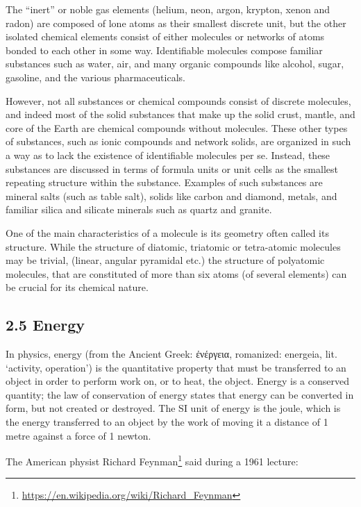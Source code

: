 \documentclass[
]{article}
\let\rmarkdownfootnote\footnote%
\def\footnote{\protect\rmarkdownfootnote}
\renewcommand{\href}[2]{#2\footnote{\url{#1}}}
\theoremstyle{definition}
\theoremstyle{definition}
\theoremstyle{definition}
\theoremstyle{remark}
\begin{document}
The ``inert'' or noble gas elements (helium, neon, argon, krypton, xenon
and radon) are composed of lone atoms as their smallest discrete unit,
but the other isolated chemical elements consist of either molecules or
networks of atoms bonded to each other in some way. Identifiable
molecules compose familiar substances such as water, air, and many
organic compounds like alcohol, sugar, gasoline, and the various
pharmaceuticals.

However, not all substances or chemical compounds consist of discrete
molecules, and indeed most of the solid substances that make up the
solid crust, mantle, and core of the Earth are chemical compounds
without molecules. These other types of substances, such as ionic
compounds and network solids, are organized in such a way as to lack the
existence of identifiable molecules per se. Instead, these substances
are discussed in terms of formula units or unit cells as the smallest
repeating structure within the substance. Examples of such substances
are mineral salts (such as table salt), solids like carbon and diamond,
metals, and familiar silica and silicate minerals such as quartz and
granite.

One of the main characteristics of a molecule is its geometry often
called its structure. While the structure of diatomic, triatomic or
tetra-atomic molecules may be trivial, (linear, angular pyramidal etc.)
the structure of polyatomic molecules, that are constituted of more than
six atoms (of several elements) can be crucial for its chemical nature.

\hypertarget{energy-1}{}
\hypertarget{energy}{%
\subsection{\texorpdfstring{{2.5} Energy}{2.5 Energy}}\label{energy}}

In physics, energy (from the Ancient Greek: ἐνέργεια, romanized:
energeia, lit. `activity, operation') is the quantitative property that
must be transferred to an object in order to perform work on, or to
heat, the object. Energy is a conserved quantity; the law of
conservation of energy states that energy can be converted in form, but
not created or destroyed. The SI unit of energy is the joule, which is
the energy transferred to an object by the work of moving it a distance
of 1 metre against a force of 1 newton.

The American physist
\href{https://en.wikipedia.org/wiki/Richard_Feynman}{Richard Feynman}
said during a 1961 lecture:
\end{document}
